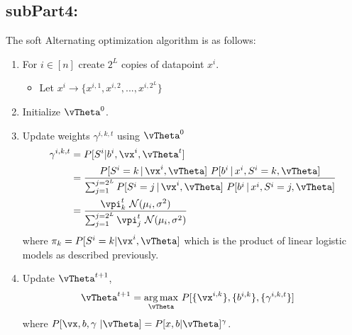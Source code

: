 \documentclass[a4paper,11pt]{article}
\begin{document}
\begin{mlsolution}
	\subsection{subPart4:}
	The soft Alternating optimization algorithm is as follows:
	\begin{enumerate}
		\item For $i \in [n]$ create $2^L$ copies of datapoint $x^i$.
			\begin{itemize}
				\item Let $x^i \rightarrow \{x^{i,1}, x^{i,2},..., x^{i,2^L}\}$
			\end{itemize}
		\item Initialize $\vTheta^0$.
		\item Update weights $\gamma^{i,k,t}$ using $\vTheta^0$
				\begin{align*}
					\gamma^{i,k,t} &= P[S^i | b^i, \vx^i, \vTheta^t]\\
					&= \frac{P[S^i = k \cond \vx^i, \vTheta]\ P[b^i\cond x^i, S^i = k, \vTheta]}
					{\sum_{j=1}^{j=2^L}P[S^i = j\cond \vx^i, \vTheta]\ P[b^i\cond x^i, S^i = j, \vTheta]}\\
					&= \frac{\mathcal{\vpi}_k^t\ \mathcal{N}(\mu_i, \sigma^2)}
					{\sum_{j=1}^{j=2^L}\mathcal{\vpi}_j^t\ \mathcal{N}(\mu_i, \sigma^2)}
				\end{align*}
				where $\mathcal{\pi}_k = P[S^i = k | \vx^i, \vTheta]$ which is the product of linear logistic models as described previously.
		\item Update $\vTheta^{t+1}$,
		\begin{align*}
			\vTheta^{t+1} &= \underset{\vTheta}{\arg\max}\ P[\{\vx^{i,k}\}, \{b^{i,k}\}, \{\gamma^{i,k,t}\}]
		\end{align*}
		where $P[\vx,b,\gamma\ |\vTheta] = P[x,b|\vTheta]^\gamma$.
	\end{enumerate}
	
	
	
\end{mlsolution}


\end{document}
